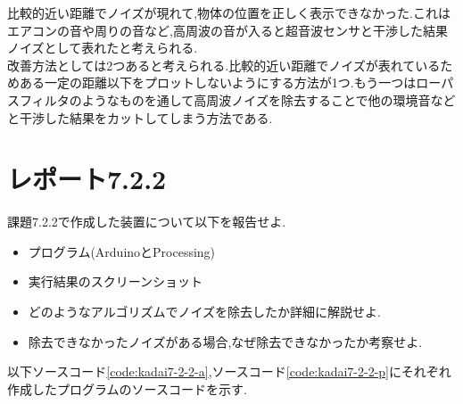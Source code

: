 \documentclass{jarticle}
\begin{document}
比較的近い距離でノイズが現れて,物体の位置を正しく表示できなかった.これはエアコンの音や周りの音など,高周波の音が入ると超音波センサと干渉した結果ノイズとして表れたと考えられる.\\
改善方法としては2つあると考えられる.比較的近い距離でノイズが表れているためある一定の距離以下をプロットしないようにする方法が1つ.もう一つはローパスフィルタのようなものを通して高周波ノイズを除去することで他の環境音などと干渉した結果をカットしてしまう方法である.

\section{レポート7.2.2}
課題7.2.2で作成した装置について以下を報告せよ.
\begin{itemize}
\item プログラム(ArduinoとProcessing)
\item 実行結果のスクリーンショット
\item どのようなアルゴリズムでノイズを除去したか詳細に解説せよ.
\item 除去できなかったノイズがある場合,なぜ除去できなかったか考察せよ.
\end{itemize}


以下ソースコード\ref{code:kadai7-2-2-a},ソースコード\ref{code:kadai7-2-2-p}にそれぞれ作成したプログラムのソースコードを示す.
\end{document}
